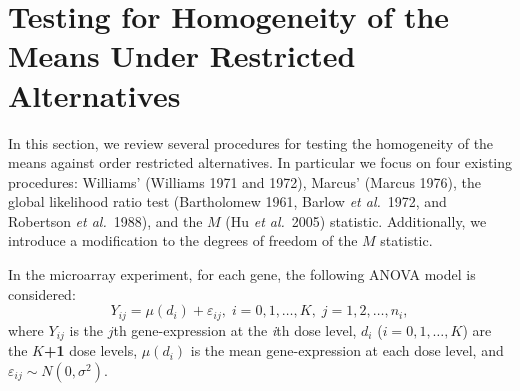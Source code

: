 \documentclass[10pt]{mybook4}
\newcommand{\markchapter}[1]{\markboth{
   \mbox{}\hfill {\it Chapter \thechapter}. \ {\it #1}  \hfill  \mbox{}\hspace{-\textwidth} \protect\rule[-2mm]{\textwidth}{.15mm}}{}}
\begin{document}

\section{Testing for Homogeneity of the Means Under Restricted
Alternatives} \label{sec: testing}

In this section, we review several procedures for testing the
homogeneity of the means against order restricted alternatives. In
particular we focus on four existing procedures: Williams' (Williams
1971 and 1972), Marcus' (Marcus 1976), the global likelihood ratio
test (Bartholomew 1961, Barlow \textit{et al.}\ 1972, and Robertson
\textit{et al.}\ 1988), and the $M$ (Hu \textit{et al.}\ 2005)
statistic. Additionally, we introduce a modification to the degrees
of freedom of the $M$ statistic.

In the microarray experiment, for each gene, the following ANOVA
model is considered:
\begin{equation}
\label{themodel} Y_{ij}=\mu(d_{i})+\varepsilon_{ij},\;i=0,1,\dots,
K,\;j=1,2, \dots, n_i,
\end{equation}
where $Y_{ij}$ is the $j$th gene-expression at the \textit{i}th dose
level, $d_{i}$ ($i=0,1,\dots, K$) are the \textbf{$K$+1} dose
levels, $\mu(d_{i})$ is the mean gene-expression at each dose level,
and $\varepsilon_{ij} \sim N(0,\sigma^{2})$.
\end{document}
